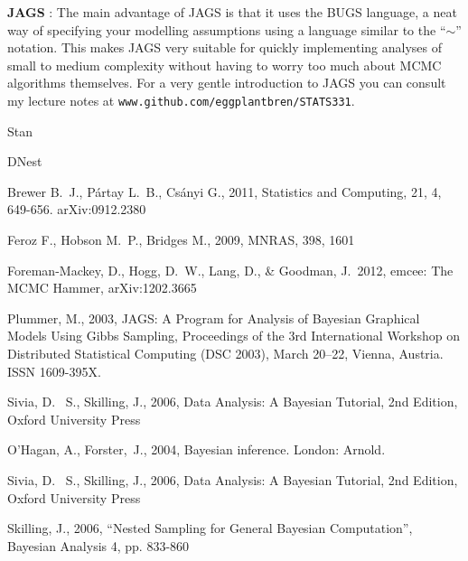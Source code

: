 {\bf JAGS} \citep{jags}: The main advantage of JAGS is that it
uses the BUGS language, a neat way of specifying your modelling assumptions
using a language similar to the ``$\sim$'' notation. This makes JAGS very
suitable for quickly implementing analyses of small to medium complexity without
having to worry too much about MCMC algorithms themselves. For a very gentle
introduction to JAGS you can consult my lecture notes at
{\tt www.github.com/eggplantbren/STATS331}.

Stan

DNest


\begin{thebibliography}{99}

 Brewer B.~J., P{\'a}rtay L.~B., Cs{\'a}nyi G., 2011,
Statistics and Computing, 21, 4, 649-656. arXiv:0912.2380

 Feroz F., Hobson M.~P., Bridges M., 2009, MNRAS, 398, 1601

 Foreman-Mackey, 
D., Hogg, D.~W., Lang, D., \& Goodman, J.\ 2012, emcee: The MCMC Hammer, arXiv:1202.3665 

Plummer, M., 2003, JAGS: A Program for Analysis of Bayesian Graphical Models
Using Gibbs Sampling, Proceedings of the 3rd International Workshop on
Distributed Statistical Computing (DSC 2003), March 20--22, Vienna, Austria.
ISSN 1609-395X.

 Sivia, 
D.~ S., Skilling, J., 2006, Data Analysis: A Bayesian Tutorial, 2nd 
Edition, Oxford University Press

O'Hagan, A., Forster,~J., 2004, Bayesian inference. London: Arnold.

 Sivia, 
D.~ S., Skilling, J., 2006, Data Analysis: A Bayesian Tutorial, 2nd 
Edition, Oxford University Press

 Skilling, 
J., 2006, ``Nested Sampling for General Bayesian Computation'', Bayesian 
Analysis 4, pp. 833-860

\end{thebibliography}




%

